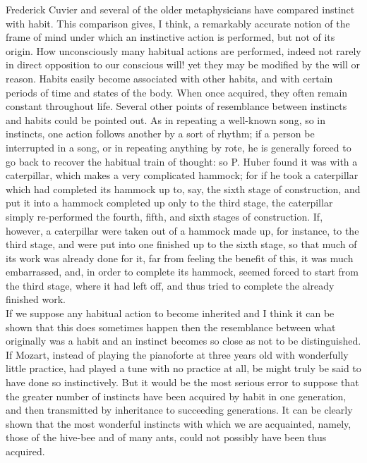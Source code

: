 \indent Frederick Cuvier and several of the older metaphysicians have compared instinct with habit. This comparison gives, I think, a remarkably accurate notion of the frame of mind under which an instinctive action is performed, but not of its origin. How unconsciously many habitual actions are performed, indeed not rarely in direct opposition to our conscious will! yet they may be modified by the will or reason. Habits easily become associated with other habits, and with certain periods of time and states of the body.  When once acquired, they often remain constant throughout life.  Several other points of resemblance between instincts and habits could be pointed out. As in repeating a well-known song, so in instincts, one action follows another by a sort of rhythm; if a person be interrupted in a song, or in repeating anything by rote, he is generally forced to go back to recover the habitual train of thought: so P. Huber found it was with a caterpillar, which makes a very complicated hammock; for if he took a caterpillar which had completed its hammock up to, say, the sixth stage of construction, and put it into a hammock completed up only to the third stage, the caterpillar simply re-performed the fourth, fifth, and sixth stages of construction.  If, however, a caterpillar were taken out of a hammock made up, for instance, to the third stage, and were put into one finished up to the sixth stage, so that much of its work was already done for it, far from feeling the benefit of this, it was much embarrassed, and, in order to complete its hammock, seemed forced to start from the third stage, where it had left off, and thus tried to complete the already finished work.\\
\indent If we suppose any habitual action to become inherited and I think it can be shown that this does sometimes happen then the resemblance between what originally was a habit and an instinct becomes so close as not to be distinguished.  If Mozart, instead of playing the pianoforte at three years old with wonderfully little practice, had played a tune with no practice at all, be might truly be said to have done so instinctively. But it would be the most serious error to suppose that the greater number of instincts have been acquired by habit in one generation, and then transmitted by inheritance to succeeding generations. It can be clearly shown that the most wonderful instincts with which we are acquainted, namely, those of the hive-bee and of many ants, could not possibly have been thus acquired.\\
